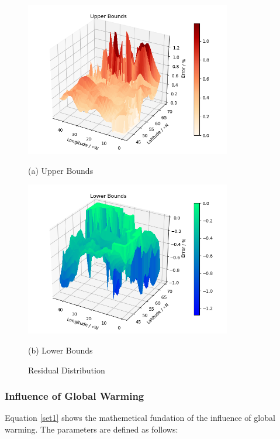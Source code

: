 \documentclass{mcmthesis}
\begin{document}
     \begin{figure}[H]
     \begin{minipage}{0.5\linewidth}
       \centerline{\includegraphics[width=9.0cm]{plots/grey_forcast_err_1_V1.png}}
       \centerline{(a) Upper Bounds}
     \end{minipage}
     \hfill
     \begin{minipage}{.5\linewidth}
       \centerline{\includegraphics[width=9.0cm]{plots/grey_forcast_err_2_V1.png}}
       \centerline{(b) Lower Bounds}
     \end{minipage}
     \caption{Residual Distribution}
     \label{figures}
     \end{figure}

\subsubsection{Influence of Global Warming}\label{S4ss2}
	Equation \ref{set1} shows the mathemetical fundation of the influence of global warming. The parameters are defined as follows:
\end{document}
